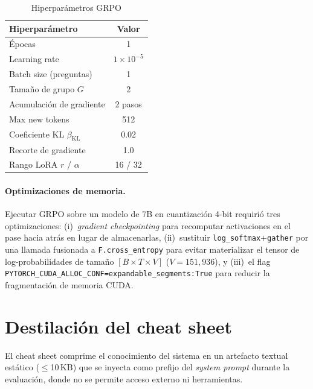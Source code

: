 \documentclass{article}
\begin{document}
\begin{table}[h]
  \caption{Hiperpar\'ametros GRPO}
  \label{tab:grpo}
  \centering
  \begin{tabular}{lc}
    \toprule
    Hiperpar\'ametro & Valor \\
    \midrule
    \'Epocas & 1 \\
    Learning rate & $1 \times 10^{-5}$ \\
    Batch size (preguntas) & 1 \\
    Tama\~no de grupo $G$ & 2 \\
    Acumulaci\'on de gradiente & 2 pasos \\
    Max new tokens & 512 \\
    Coeficiente KL $\beta_{\text{KL}}$ & 0.02 \\
    Recorte de gradiente & 1.0 \\
    Rango LoRA $r$ / $\alpha$ & 16 / 32 \\
    \bottomrule
  \end{tabular}
\end{table}

\paragraph{Optimizaciones de memoria.} Ejecutar GRPO sobre un modelo de 7B en cuantizaci\'on 4-bit requiri\'o tres optimizaciones: (i)~\textit{gradient checkpointing} para recomputar activaciones en el pase hacia atr\'as en lugar de almacenarlas, (ii)~sustituir \texttt{log\_softmax}+\texttt{gather} por una llamada fusionada a \texttt{F.cross\_entropy} para evitar materializar el tensor de log-probabilidades de tama\~no $[B \times T \times V]$ ($V{=}151{,}936$), y (iii)~el flag \texttt{PYTORCH\_CUDA\_ALLOC\_CONF=expandable\_segments:True} para reducir la fragmentaci\'on de memoria CUDA.

\section{Destilaci\'on del cheat sheet}
\label{sec:cheatsheet}

El cheat sheet comprime el conocimiento del sistema en un artefacto textual est\'atico ($\leq$10\,KB) que se inyecta como prefijo del \textit{system prompt} durante la evaluaci\'on, donde no se permite acceso externo ni herramientas.
\end{document}

